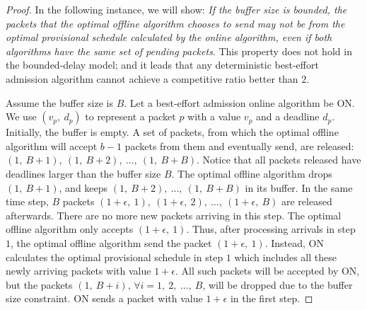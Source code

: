 \documentclass[final, 11pt]{article}
\begin{document}
\begin{proof}
In the following instance, we will show: {\em If the buffer size is bounded, the packets that the optimal offline algorithm chooses to send may not be from the optimal provisional schedule calculated by the online algorithm, even if both algorithms have the same set of pending packets}. This property does not hold in the bounded-delay model; and it leads that any deterministic best-effort admission algorithm cannot achieve a competitive ratio better than $2$.

Assume the buffer size is $B$. Let a best-effort admission online algorithm be ON. We use $(v_p, \ d_p)$ to represent a packet $p$ with a value $v_p$ and a deadline $d_p$. Initially, the buffer is empty.  A set of packets, from which the optimal offline algorithm will accept $b - 1$ packets from them and eventually send, are released: $(1, \ B + 1), \ (1, \ B + 2), \ \ldots, \ (1, \ B + B)$. Notice that all packets released have deadlines larger than the buffer size $B$. The optimal offline algorithm drops $(1, \ B + 1)$, and keeps $(1, \ B + 2), \ \ldots, \ (1, \ B + B)$ in its buffer. In the same time step, $B$ packets $(1 + \epsilon, \ 1), \ (1 + \epsilon, \ 2), \ \ldots, \ (1 + \epsilon, \ B)$ are released afterwards. There are no more new packets arriving in this step. The optimal offline algorithm only accepts $(1 + \epsilon, \ 1)$. Thus, after processing arrivals in step $1$, the optimal offline algorithm send the packet $(1 + \epsilon, \ 1)$. Instead, ON calculates the optimal provisional schedule in step $1$ which includes all these newly arriving packets with value $1 + \epsilon$. All such packets will be accepted by ON, but the packets $(1, \ B + i)$, $\forall i = 1, \ 2, \ \ldots, \ B$, will be dropped due to the buffer size constraint. ON sends a packet with value $1 + \epsilon$ in the first step.


\end{proof}
\end{document}
